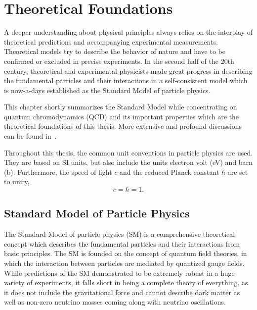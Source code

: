 
\chapter{Theoretical Foundations}
\label{sec:theoretical_foundations}

A deeper understanding about physical principles always relies on the interplay
of theoretical predictions and accompanying experimental measurements.
Theoretical models try to describe the behavior of nature and have to be
confirmed or excluded in precise experiments. In the second half of the 20th
century, theoretical and experimental physicists made great progress in describing the
fundamental particles and their interactions in a self-consistent model which is
now-a-days established as the Standard Model of particle physics.

This chapter shortly summarizes the Standard Model while concentrating on
quantum chromodynamics (QCD) and its important properties which are the
theoretical foundations of this thesis. More extensive and profound
discussions can be found in~\cite{Peskin:1995ev,Agashe:2014kda,Ellis:1991qj,Buckley:2011ms}.

Throughout this thesis, the common unit conventions in particle physics are
used.  They are based on SI units, but also include the units electron volt
(\si{\electronvolt}) and barn (\si{\barn}). Furthermore, the speed of light $c$
and the reduced Planck constant $\hbar$ are set to unity,
%
\begin{equation*}
    c = \hbar = 1.
\end{equation*}

\section{Standard Model of Particle Physics}

The Standard Model of particle physics (SM) is a comprehensive theoretical
concept which describes the fundamental particles and their interactions from
basic principles. The SM is founded on the concept of quantum field theories, in
which the interaction between particles are mediated by quantized gauge fields.
While predictions of the SM demonstrated to be extremely robust in a huge variety
of experiments, it falls short in being a complete theory of everything, as it
does not include the gravitational force and cannot describe dark matter as well
as non-zero neutrino masses coming along with neutrino oscillations.

